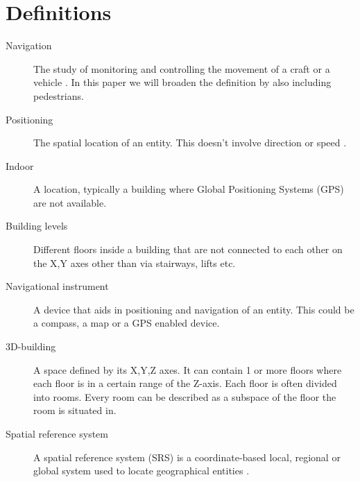 \section{Definitions} %
\label{sec:definitions}

\begin{description}
	\item[Navigation] The study of monitoring and controlling the movement of a craft or a vehicle \cite{wiki_navi}. In this paper we will broaden the definition by also including pedestrians.
	
	\item[Positioning] The spatial location of an entity. This doesn't involve direction or speed \cite{wiki_pos}.
	
	\item[Indoor] A location, typically a building where Global Positioning Systems (GPS) are not available.
	
	\item[Building levels] Different floors inside a building that are not connected to each other on the X,Y axes other than via stairways, lifts etc.
	
	\item[Navigational instrument] A device that aids in positioning and navigation of an entity. This could be a compass, a map or a GPS enabled device.
	
	\item[3D-building] A space defined by its X,Y,Z axes. It can contain 1 or more floors where each floor is in a certain range of the Z-axis. Each floor is often divided into rooms. Every room can be described as a subspace of the floor the room is situated in.
	
	\item[Spatial reference system] A spatial reference system (SRS) is a coordinate-based local, regional or global system used to locate geographical entities \cite{wiki_srs}.
\end{description}

